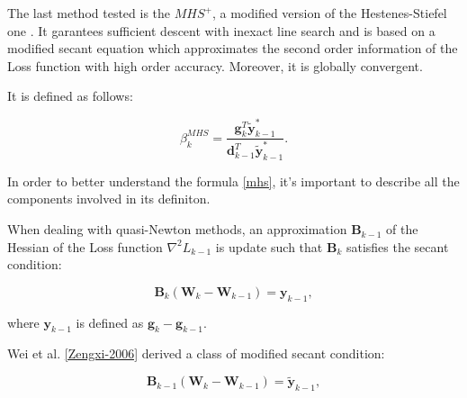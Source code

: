 
			The last method tested is the $MHS^+$, a modified version of the Hestenes-Stiefel one \cite{LIVIERIS2013491}.
			It garantees sufficient descent with inexact line search and is based on a modified secant equation which approximates the second order information of the Loss function with high order accuracy. Moreover, it is globally convergent.

			It is defined as follows:

			\begin{equation}
			\label{mhs}
 				 \beta^{MHS}_k = \frac{\mathbf{g}_k^T \widetilde{\textbf{y}}_{k-1}^*}{\mathbf{d}_{k-1}^T\widetilde{\textbf{y}}_{k-1}^*}.
			\end{equation}

			In order to better understand the formula \ref{mhs}, it's important to describe all the components involved in its definiton.

			When dealing with quasi-Newton methods, an approximation $\textbf{B}_{k-1}$ of the Hessian of the Loss function $\nabla^2\textit{L}_{k-1}$ is update such that $\textbf{B}_k$ satisfies the secant condition:

			\begin{equation}
			\label{secant_1}
 				\textbf{B}_k (\textbf{W}_k - \textbf{W}_{k-1}) = \textbf{y}_{k-1},
 			\end{equation}

 			where $\textbf{y}_{k-1}$ is defined as $\textbf{g}_k - \textbf{g}_{k-1}$.

 			Wei et al. \ref{Zengxi-2006} derived a class of modified secant condition:

			\begin{equation}
			\label{secant_2}
 				\textbf{B}_{k-1} (\textbf{W}_k - \textbf{W}_{k-1}) = \widetilde{\textbf{y}}_{k-1},
 			\end{equation}


